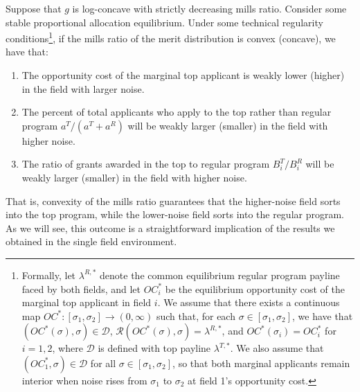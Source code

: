 \documentclass[12pt,reqno]{amsart}
\theoremstyle{definition}
\theoremstyle{plain} %
\newenvironment{customprop}[1]{\renewcommand\theinnercustomprop{#1}\innercustomprop}{\endinnercustomprop}
\begin{document}
\begin{customprop}{1}
Suppose that $g$ is log-concave with strictly decreasing mills ratio. Consider some stable proportional allocation equilibrium. Under some technical regularity conditions\footnote{Formally, let $\lambda^{R,*}$ denote the common equilibrium regular program payline faced by both fields, and let $OC_i^*$ be the equilibrium opportunity cost of the marginal top applicant in field $i$. We assume that there exists a continuous map $OC^*:[\sigma_1,\sigma_2]\rightarrow (0,\infty)$ such that, for each $\sigma\in[\sigma_1,\sigma_2]$, we have that $(OC^*(\sigma),\sigma)\in \mathcal{D}$, $\mathcal{R}(OC^*(\sigma),\sigma) = \lambda^{R,*}$, and $OC^*(\sigma_i) = OC_i^*$ for $i=1,2$, where $\mathcal{D}$ is defined with top payline $\lambda^{T,*}$. We also assume that $(OC_1^*,\sigma)\in\mathcal{D}$ for all $\sigma\in[\sigma_1,\sigma_2]$, so that both marginal applicants remain interior when noise rises from $\sigma_1$ to $\sigma_2$ at field 1's opportunity cost.}, if the mills ratio of the merit distribution is convex (concave), we have that:
\vspace{-5pt}
\begin{enumerate}[label=(\arabic*),ref=\theinnercustomprop(\arabic*)]
   \item The opportunity cost of the marginal top applicant is weakly lower (higher) in the field with larger noise. 
   \item The percent of total applicants who apply to the top rather than regular program $a^T/(a^T+a^R)$ will be weakly larger (smaller) in the field with higher noise. 
   \item The ratio of grants awarded in the top to regular program $B_i^T/B_i^R$ will be weakly larger (smaller) in the field with higher noise. 
\end{enumerate}
\end{customprop}

\noindent That is, convexity of the mills ratio guarantees that the higher-noise field sorts into the top program, while the lower-noise field sorts into the regular program. As we will see, this outcome is a straightforward implication of the results we obtained in the single field environment. 
\end{document}
